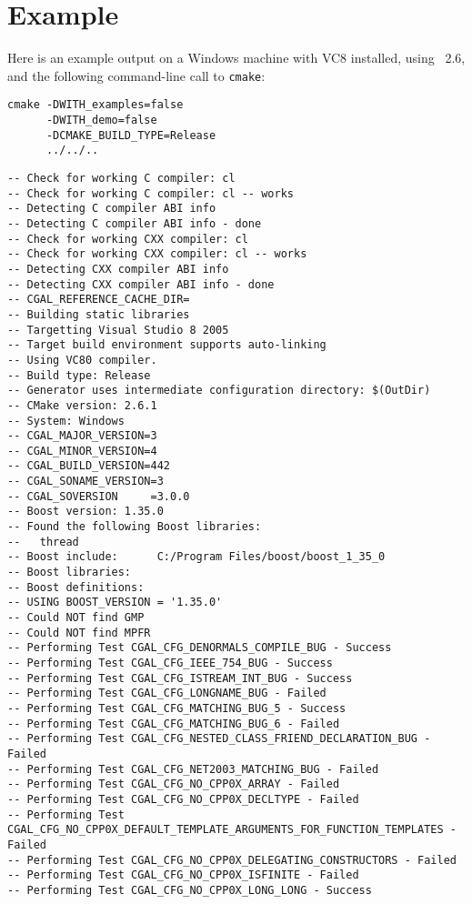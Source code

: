 \section{Example} 

Here is an example output on a Windows machine with VC8 installed, using \cmake\ 2.6,
and the following command-line call to \texttt{cmake}:

{\ccTexHtml{\scriptsize}{}
\begin{verbatim}
cmake -DWITH_examples=false 
      -DWITH_demo=false 
      -DCMAKE_BUILD_TYPE=Release 
      ../../..
\end{verbatim}
}


{\ccTexHtml{\scriptsize}{}
\begin{verbatim}
-- Check for working C compiler: cl
-- Check for working C compiler: cl -- works
-- Detecting C compiler ABI info
-- Detecting C compiler ABI info - done
-- Check for working CXX compiler: cl
-- Check for working CXX compiler: cl -- works
-- Detecting CXX compiler ABI info
-- Detecting CXX compiler ABI info - done
-- CGAL_REFERENCE_CACHE_DIR=
-- Building static libraries
-- Targetting Visual Studio 8 2005
-- Target build environment supports auto-linking
-- Using VC80 compiler.
-- Build type: Release
-- Generator uses intermediate configuration directory: $(OutDir)
-- CMake version: 2.6.1
-- System: Windows
-- CGAL_MAJOR_VERSION=3
-- CGAL_MINOR_VERSION=4
-- CGAL_BUILD_VERSION=442
-- CGAL_SONAME_VERSION=3
-- CGAL_SOVERSION     =3.0.0
-- Boost version: 1.35.0
-- Found the following Boost libraries:
--   thread
-- Boost include:      C:/Program Files/boost/boost_1_35_0
-- Boost libraries:    
-- Boost definitions:  
-- USING BOOST_VERSION = '1.35.0'
-- Could NOT find GMP
-- Could NOT find MPFR
-- Performing Test CGAL_CFG_DENORMALS_COMPILE_BUG - Success
-- Performing Test CGAL_CFG_IEEE_754_BUG - Success
-- Performing Test CGAL_CFG_ISTREAM_INT_BUG - Success
-- Performing Test CGAL_CFG_LONGNAME_BUG - Failed
-- Performing Test CGAL_CFG_MATCHING_BUG_5 - Success
-- Performing Test CGAL_CFG_MATCHING_BUG_6 - Failed
-- Performing Test CGAL_CFG_NESTED_CLASS_FRIEND_DECLARATION_BUG - Failed
-- Performing Test CGAL_CFG_NET2003_MATCHING_BUG - Failed
-- Performing Test CGAL_CFG_NO_CPP0X_ARRAY - Failed
-- Performing Test CGAL_CFG_NO_CPP0X_DECLTYPE - Failed
-- Performing Test CGAL_CFG_NO_CPP0X_DEFAULT_TEMPLATE_ARGUMENTS_FOR_FUNCTION_TEMPLATES - Failed
-- Performing Test CGAL_CFG_NO_CPP0X_DELEGATING_CONSTRUCTORS - Failed
-- Performing Test CGAL_CFG_NO_CPP0X_ISFINITE - Failed
-- Performing Test CGAL_CFG_NO_CPP0X_LONG_LONG - Success

\end{verbatim}}
